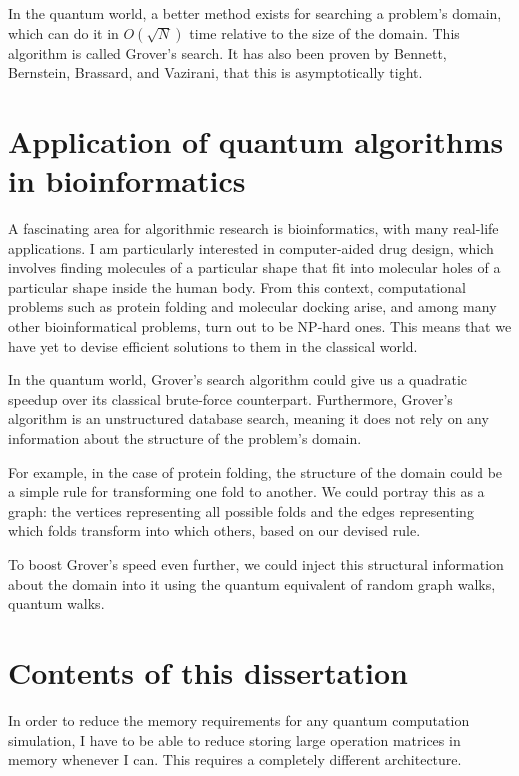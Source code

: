 In the quantum world, a better method exists for searching a problem's domain, which can do it in $O(\sqrt{N})$ time relative to the size of the domain. This algorithm is called Grover's search. It has also been proven by Bennett, Bernstein, Brassard, and Vazirani, that this is asymptotically tight\cite{bennett_strengths_1997}.

\section{Application of quantum algorithms in bioinformatics}

A fascinating area for algorithmic research is bioinformatics, with many real-life applications. I am particularly interested in computer-aided drug design, which involves finding molecules of a particular shape that fit into molecular holes of a particular shape inside the human body. From this context, computational problems such as protein folding\cite{crescenzi_complexity_1998} and molecular docking\cite{a_molecular_2018} arise, and among many other bioinformatical problems, turn out to be NP-hard ones. This means that we have yet to devise efficient solutions to them in the classical world.

In the quantum world, Grover's search algorithm could give us a quadratic speedup over its classical brute-force counterpart. Furthermore, Grover's algorithm is an unstructured database search, meaning it does not rely on any information about the structure of the problem's domain.

For example, in the case of protein folding, the structure of the domain could be a simple rule for transforming one fold to another. We could portray this as a graph: the vertices representing all possible folds and the edges representing which folds transform into which others, based on our devised rule.

To boost Grover's speed even further, we could inject this structural information about the domain into it using the quantum equivalent of random graph walks, quantum walks.

\section{Contents of this dissertation}


In order to reduce the memory requirements for any quantum computation simulation, I have to be able to reduce storing large operation matrices in memory whenever I can. This requires a completely different architecture.

